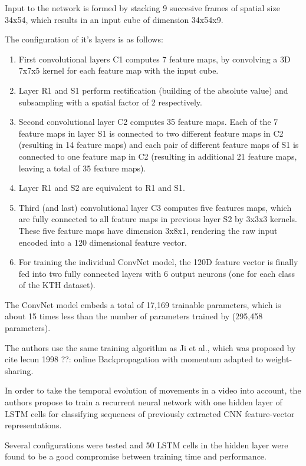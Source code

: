 Input to the network is formed by stacking 9 succesive frames of spatial size 34x54, which results in an input cube of dimension 34x54x9.

The configuration of it's layers is as follows:

\begin{enumerate}
    \item First convolutional layers C1 computes 7 feature maps, by convolving a 3D 7x7x5 kernel for each feature map with the input cube.
    \item Layer R1 and S1 perform rectification (building of the absolute value) and subsampling with a spatial factor of 2 respectively.
    \item Second convolutional layer C2 computes 35 feature maps. Each of the 7 feature maps in layer S1 is connected to two different feature maps in C2 (resulting in 14 feature maps) and each pair of different feature maps of S1 is connected to one feature map in C2 (resulting in additional 21 feature maps, leaving a total of 35 feature maps).
    \item Layer R1 and S2 are equivalent to R1 and S1.
    \item Third (and last) convolutional layer C3 computes five features maps, which are fully connected to all feature maps in previous layer S2 by 3x3x3 kernels. These five feature maps have dimension 3x8x1, rendering the raw input encoded into a 120 dimensional feature vector.
    \item For training the individual ConvNet model, the 120D feature vector is finally fed into two fully connected layers with 6 output neurons (one for each class of the KTH dataset).
\end{enumerate}

The ConvNet model embeds a total of 17,169 trainable parameters, which is about 15 times less than the number of parameters trained by \textcite{ji_3d_2013} (295,458 parameters).

The authors use the same training algorithm as Ji et al., which was proposed by cite lecun 1998 ??: online Backpropagation with momentum adapted to weight-sharing.

In order to take the temporal evolution of movements in a video into account, the authors propose to train a recurrent neural network with one hidden layer of LSTM cells for classifying sequences of previously extracted CNN feature-vector representations.

Several configurations were tested and 50 LSTM cells in the hidden layer were found to be a good compromise between training time and performance.

